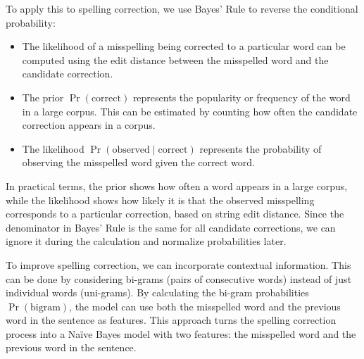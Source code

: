 To apply this to spelling correction, we use Bayes' Rule to reverse the conditional probability:
\begin{itemize}
    \item The likelihood of a misspelling being corrected to a particular word can be computed using the edit distance between the misspelled word and the candidate correction.
    \item The prior $\Pr(\text{correct})$ represents the popularity or frequency of the word in a large corpus. 
        This can be estimated by counting how often the candidate correction appears in a corpus.
        \item The likelihood $\Pr(\text{observed}\mid\text{correct})$ represents the probability of observing the misspelled word given the correct word.
\end{itemize}
In practical terms, the prior shows how often a word appears in a large corpus, while the likelihood shows how likely it is that the observed misspelling corresponds to a particular correction, based on string edit distance.
Since the denominator in Bayes' Rule is the same for all candidate corrections, we can ignore it during the calculation and normalize probabilities later.

To improve spelling correction, we can incorporate contextual information.
This can be done by considering bi-grams (pairs of consecutive words) instead of just individual words (uni-grams).
By calculating the bi-gram probabilities $\Pr(\text{bigram})$, the model can use both the misspelled word and the previous word in the sentence as features.
This approach turns the spelling correction process into a Naïve Bayes model with two features: the misspelled word and the previous word in the sentence.
